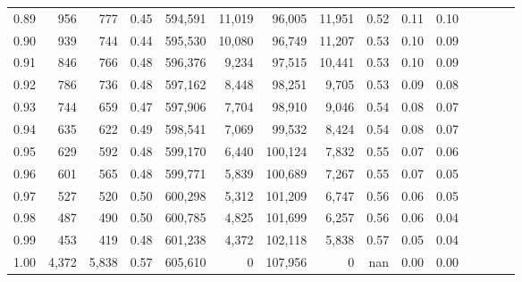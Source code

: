 \begin{tabular}{rrrcrrrrrrrrrrr}
0.89 &     956 &    777 &                                       0.45 &  594,591 &   11,019 &   96,005 &   11,951 &  0.52 &  0.11 &                         0.10 \\
0.90 &     939 &    744 &                                       0.44 &  595,530 &   10,080 &   96,749 &   11,207 &  0.53 &  0.10 &                         0.09 \\
0.91 &     846 &    766 &                                       0.48 &  596,376 &    9,234 &   97,515 &   10,441 &  0.53 &  0.10 &                         0.09 \\
0.92 &     786 &    736 &                                       0.48 &  597,162 &    8,448 &   98,251 &    9,705 &  0.53 &  0.09 &                         0.08 \\
0.93 &     744 &    659 &                                       0.47 &  597,906 &    7,704 &   98,910 &    9,046 &  0.54 &  0.08 &                         0.07 \\
0.94 &     635 &    622 &                                       0.49 &  598,541 &    7,069 &   99,532 &    8,424 &  0.54 &  0.08 &                         0.07 \\
0.95 &     629 &    592 &                                       0.48 &  599,170 &    6,440 &  100,124 &    7,832 &  0.55 &  0.07 &                         0.06 \\
0.96 &     601 &    565 &                                       0.48 &  599,771 &    5,839 &  100,689 &    7,267 &  0.55 &  0.07 &                         0.05 \\
0.97 &     527 &    520 &                                       0.50 &  600,298 &    5,312 &  101,209 &    6,747 &  0.56 &  0.06 &                         0.05 \\
0.98 &     487 &    490 &                                       0.50 &  600,785 &    4,825 &  101,699 &    6,257 &  0.56 &  0.06 &                         0.04 \\
0.99 &     453 &    419 &                                       0.48 &  601,238 &    4,372 &  102,118 &    5,838 &  0.57 &  0.05 &                         0.04 \\
1.00 &   4,372 &  5,838 &                                       0.57 &  605,610 &        0 &  107,956 &        0 &   nan &  0.00 &                         0.00 \\
\bottomrule
\end{tabular}
